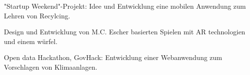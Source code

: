 \documentclass[a4paper]{deedy-resume_twopage} %
\begin{document}
\begin{minipage}[t]{0.66\textwidth}
  \sectionspace %


  "Startup Weekend"-Projekt: Idee und Entwicklung eine mobilen Anwendung zum Lehren von Recylcing.

  \sectionspace %



  Design und Entwicklung von M.C. Escher basierten Spielen mit AR technologien und einem würfel.

  \sectionspace %



  Open data Hackathon, GovHack: Entwicklung einer Webanwendung zum Vorschlagen von Klimaanlagen.

  \sectionspace %


\end{minipage}
\end{document}
